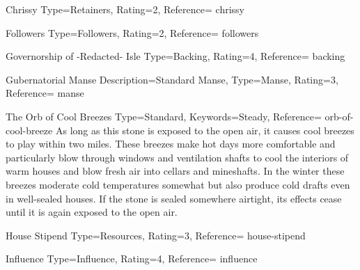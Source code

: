 ﻿


\begin{Merit}{Chrissy}{%
    Type=Retainers,
    Rating=2,
    Reference=\cite*[p.~164]{ex3}
}{chrissy}
    \TBW
\end{Merit}


\begin{Merit}{Followers}{%
    Type=Followers,
    Rating=2,
    Reference=\cite*[p.~161]{ex3}
}{followers}
    \TBW
\end{Merit}


\begin{Merit}{Governorship of -Redacted- Isle}{%
    Type=Backing,
    Rating=4,
    Reference=\cite*[p.~159]{ex3}
}{backing}
    \TBW
\end{Merit}


\begin{Merit}{Gubernatorial Manse}{%
    Description={Standard Manse},
    Type=Manse,
    Rating=3,
    Reference=\cite*[p.~163]{ex3}
}{manse}
    \TBW

    \begin{Hearthstone}{The Orb of Cool Breezes}{%
        Type=Standard,
        Keywords=Steady,
        Reference=\cite*[p.~604]{ex3}
    }{orb-of-cool-breeze}
        As long as this stone is exposed to the open air, it causes cool
        breezes to play within two miles. These breezes make hot days more
        comfortable and particularly blow through windows and ventilation
        shafts to cool the interiors of warm houses and blow fresh air into
        cellars and mineshafts. In the winter these breezes moderate cold
        temperatures somewhat but also produce cold drafts even in
        well-sealed houses. If the stone is sealed somewhere airtight, its
        effects cease until it is again exposed to the open air.
    \end{Hearthstone}
\end{Merit}


\DocumentColumnBreak
\begin{Merit}{House Stipend}{%
    Type=Resources,
    Rating=3,
    Reference=\cite*[p.~164]{ex3}
}{house-stipend}
    \TBW

\end{Merit}


\begin{Merit}{Influence}{%
    Type=Influence,
    Rating=4,
    Reference=\cite*[p.~162]{ex3}
}{influence}
    \TBW
\end{Merit}


